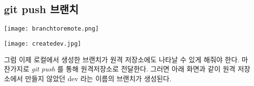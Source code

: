 \documentclass[11pt]{article}
\begin{document}
	\subsection{git push 브랜치}
	\begin{center}\texttt{[image: branchtoremote.png]}\end{center}
	\begin{center}\texttt{[image: createdev.jpg]}\end{center}
	그럼 이제 로컬에서 생성한 브랜치가 원격 저장소에도 나타날 수 있게 해줘야 한다. 마찬가지로 \textit{git push} 를 통해 원격저장소로 전달한다. 그러면 아래 화면과 같이 원격 저장소에서 만들지 않았던 dev 라는 이름의 브랜치가 생성된다. 
	
	
	
	
	
	
\end{document}
